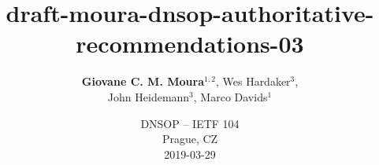 \documentclass[11pt,show 
notes,notheorems,noamsthm,blank]{beamer} %
\begin{document}
\title{draft-moura-dnsop-authoritative-recommendations-03}  
\author[Moura et. al]{\textbf{Giovane C. M. Moura}$^{1,2}$, Wes Hardaker$^3$, 
\\John Heidemann$^3$, Marco Davids$^1$\\}
\vspace{-0.3cm}


   
   
\date {DNSOP -- IETF 104\\Prague, CZ\\
2019-03-29\\


}  

\frame{\titlepage} 
\end{document}
